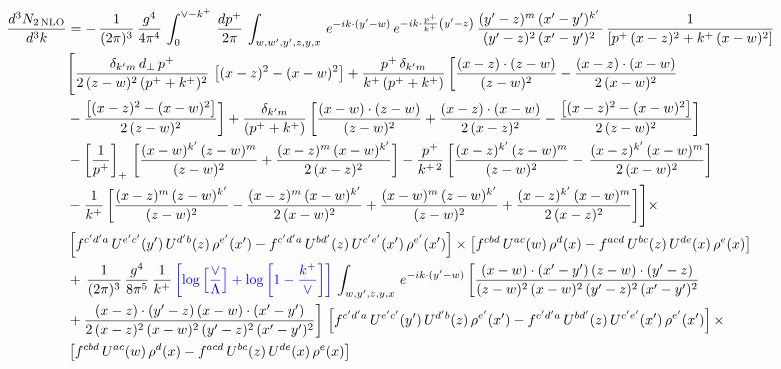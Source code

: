 \documentclass[9pt]{article}
\numberwithin{equation}{section}
\begin{document}
\begin{align}
 \frac{d^{3}N_{2\,\rm NLO}}{d^{3}k} & = -\, \frac{1}{(2\pi)^{3}}\,\frac{g^{4}}{4\pi^{4}}\,\int_{0}^{\vee-k^{+}}\, \frac{dp^{+}}{2\pi}\,\int_{w,w',y',z,y,x}\, e^{-ik\cdot (y'-w)}\,e^{-ik\cdot \frac{p^{+}}{k^{+}}\left(y'-z\right)}\, \frac{(y'-z)^{m}\,(x'-y')^{k'}\,}{(y'-z)^{2}\,(x'-y')^{2}\,}\, \frac{1}{\left[p^{+}\,(x-z)^{2}+k^{+}\,(x-w)^{2}\right]}\notag \\ & \Bigg[\frac{\delta_{k'm}\,d_{\perp}\,p^{+}}{2\,(z-w)^{2}\,(p^{+}+k^{+})^{2}}\, \left[(x-z)^{2}-(x-w)^{2}\right]+\frac{p^{+}\,\delta_{k'm}}{k^{+}\,(p^{+}+k^{+})}\,\bigg[\frac{(x-z)\cdot (z-w)}{(z-w)^{2}} -\frac{(x-z)\cdot (x-w)}{2\,(x-w)^{2}}\notag \\ & -\frac{\left[(x-z)^{2}-(x-w)^{2}\right]}{2\,(z-w)^{2}}\bigg] +\frac{\delta_{k'm}}{(p^{+}+k^{+})}\,\bigg[\frac{(x-w)\cdot (z-w)}{(z-w)^{2}}+\frac{(x-z)\cdot (x-w)}{2\,(x-z)^{2}} -\frac{\left[(x-z)^{2}-(x-w)^{2}\right]}{2\,(z-w)^{2}}\bigg]\notag \\ & -\left[\frac{1}{p^{+}}\right]_{+}\,\bigg[\frac{(x-w)^{k'}\,(z-w)^{m}}{(z-w)^{2}}+\frac{(x-z)^{m}\,(x-w)^{k'}}{2\,(x-z)^{2}}\bigg]-\frac{p^{+}}{k^{+\,2}}\,\bigg[\frac{(x-z)^{k'}\,(z-w)^{m}}{(z-w)^{2}} -\,\frac{(x-z)^{k'}\,(x-w)^{m}}{2\,(x-w)^{2}}\bigg]\notag \\ & -\frac{1}{k^{+}}\,\bigg[\frac{(x-z)^{m}\,(z-w)^{k'}}{(z-w)^{2}}-\frac{(x-z)^{m}\,(x-w)^{k'}}{2\,(x-w)^{2}}+\frac{(x-w)^{m}\,(z-w)^{k'}}{(z-w)^{2}} +\frac{(x-z)^{k'}\,(x-w)^{m}}{2\,(x-z)^{2}}\bigg]\Bigg]\times\,\notag \\ & \left[f^{c'd'a}\,U^{e'c'}(y')\,U^{d'b}(z)\,\rho^{e'}(x')-f^{c'd'a}\, 
    U^{bd'}(z)\,U^{c'e'}(x')\,\rho^{e'}(x')\right]\times \left[f^{cbd}\,U^{ac}(w)\,\rho^{d}(x) -f^{acd}\,U^{bc}(z)\,U^{de}(x)\,\rho^{e}(x)\right]\notag \\ &  +\, \frac{1}{(2\pi)^{3}}\,\frac{g^{4}}{8\pi^{5}}\,\frac{1}{k^{+}}\,{\color{blue}\left[\log{\left[\frac{\vee}{\Lambda}\right]}+\log{\left[1-\frac{k^{+}}{\vee}\right]}\right]}\,\int_{w,y',z,y,x}\, e^{-ik\cdot (y'-w)}\,\bigg[\frac{(x-w)\cdot (x'-y')\,(z-w)\cdot (y'-z)}{(z-w)^{2}\,(x-w)^{2}\,(y'-z)^{2}\,(x'-y')^{2}}\notag \\ & +\frac{(x-z)\cdot (y'-z)\,(x-w)\cdot (x'-y')}{2\,(x-z)^{2}\,(x-w)^{2}\,(y'-z)^{2}\,(x'-y')^{2}}\bigg]\, \left[f^{c'd'a}\,U^{e'c'}(y')\,U^{d'b}(z)\,\rho^{e'}(x')-f^{c'd'a}\, 
    U^{bd'}(z)\,U^{c'e'}(x')\,\rho^{e'}(x')\right]\times\notag \\ &  \left[f^{cbd}\,U^{ac}(w)\,\rho^{d}(x) -f^{acd}\,U^{bc}(z)\,U^{de}(x)\,\rho^{e}(x)\right] 
\end{align}
\end{document}
